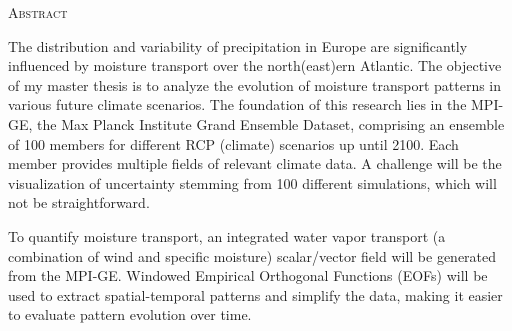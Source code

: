 \begin{center}
  \textsc{Abstract}
\end{center}
%
\noindent
%
The distribution and variability of precipitation in Europe are significantly influenced by moisture transport over the north(east)ern Atlantic.
The objective of my master thesis is to analyze the evolution of moisture transport patterns in various future climate scenarios.
The foundation of this research lies in the MPI-GE, the Max Planck Institute Grand Ensemble Dataset, comprising an ensemble of 100 members for different RCP (climate) scenarios up until 2100.
Each member provides multiple fields of relevant climate data.
A challenge will be the visualization of uncertainty stemming from 100 different simulations, which will not be straightforward.

To quantify moisture transport, an integrated water vapor transport (a combination of wind and specific moisture) scalar/vector field will be generated from the MPI-GE.
Windowed Empirical Orthogonal Functions (EOFs) will be used to extract spatial-temporal patterns and simplify the data, making it easier to evaluate pattern evolution over time.

